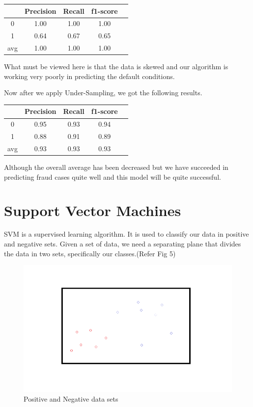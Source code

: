 \begin{center}
\begin{tabular}{| c | c | c | c | c |}
\hline
    & Precision & Recall & f1-score \\
\hline
0 & 1.00 & 1.00 & 1.00 \\
\hline
1 & 0.64 & 0.67 & 0.65 \\
\hline
avg & 1.00 & 1.00 & 1.00 \\
\hline
\end{tabular}
\end{center} 
\par What must be viewed here is that the data is skewed and our algorithm is working very poorly in predicting the default conditions.
\par Now after we apply Under-Sampling, we got the following results.

\begin{center}
\begin{tabular}{| c | c | c | c | c |}
\hline
    & Precision & Recall & f1-score \\
\hline
0 & 0.95 & 0.93 & 0.94 \\
\hline
1 & 0.88 & 0.91 & 0.89 \\
\hline
avg & 0.93 & 0.93 & 0.93 \\
\hline
\end{tabular}
\end{center}
Although the overall average has been decreased but we have succeeded in predicting fraud cases quite well and this model will be quite successful.
\section{ Support Vector Machines}
SVM is a supervised learning algorithm. It is used to classify our data in positive and negative sets.
Given a set of data, we need a separating plane that divides the data in two sets, specifically our classes.(Refer Fig 5)
\begin{figure}
  \centering
  \includegraphics[scale=0.6]{kachra.png}
  \caption{Positive and Negative data sets}
  
\end{figure}

